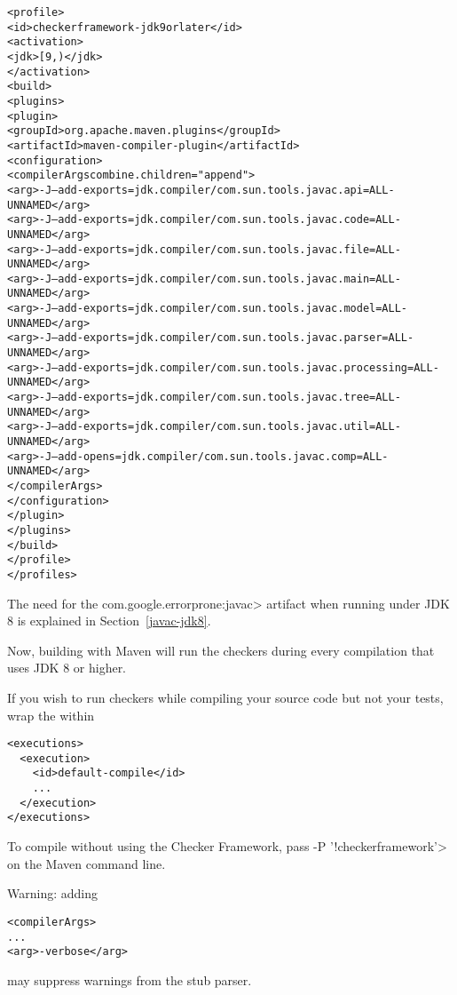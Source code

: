 \begin{enumerate}
\begin{mysmall}
\begin{alltt}
    <profile>
      <id>checkerframework-jdk9orlater</id>
      <activation>
        <jdk>[9,)</jdk>
      </activation>
      <build>
        <plugins>
          <plugin>
            <groupId>org.apache.maven.plugins</groupId>
            <artifactId>maven-compiler-plugin</artifactId>
            <configuration>
              <compilerArgs combine.children="append">
                <arg>-J--add-exports=jdk.compiler/com.sun.tools.javac.api=ALL-UNNAMED</arg>
                <arg>-J--add-exports=jdk.compiler/com.sun.tools.javac.code=ALL-UNNAMED</arg>
                <arg>-J--add-exports=jdk.compiler/com.sun.tools.javac.file=ALL-UNNAMED</arg>
                <arg>-J--add-exports=jdk.compiler/com.sun.tools.javac.main=ALL-UNNAMED</arg>
                <arg>-J--add-exports=jdk.compiler/com.sun.tools.javac.model=ALL-UNNAMED</arg>
                <arg>-J--add-exports=jdk.compiler/com.sun.tools.javac.parser=ALL-UNNAMED</arg>
                <arg>-J--add-exports=jdk.compiler/com.sun.tools.javac.processing=ALL-UNNAMED</arg>
                <arg>-J--add-exports=jdk.compiler/com.sun.tools.javac.tree=ALL-UNNAMED</arg>
                <arg>-J--add-exports=jdk.compiler/com.sun.tools.javac.util=ALL-UNNAMED</arg>
                <arg>-J--add-opens=jdk.compiler/com.sun.tools.javac.comp=ALL-UNNAMED</arg>
              </compilerArgs>
            </configuration>
          </plugin>
        </plugins>
      </build>
    </profile>
  </profiles>
\end{alltt}
\end{mysmall}

The need for the \<com.google.errorprone:javac> artifact when running under
JDK 8 is explained in Section~\ref{javac-jdk8}.

Now, building with Maven will run the checkers during every compilation
that uses JDK 8 or higher.

If you wish to run checkers while compiling your source code but not your
tests, wrap the  within

\begin{Verbatim}
<executions>
  <execution>
    <id>default-compile</id>
    ...
  </execution>
</executions>
\end{Verbatim}

To compile without using the Checker Framework, pass
\<-P '!checkerframework'>
on the Maven command line.

Warning:  adding

\begin{mysmall}
\begin{alltt}
<compilerArgs>
  ...
  <arg>-verbose</arg>
\end{alltt}
\end{mysmall}

\noindent
may suppress warnings from the stub parser.

\end{enumerate}

